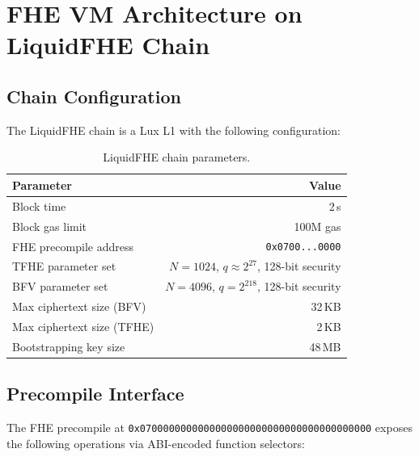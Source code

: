 \section{FHE VM Architecture on LiquidFHE Chain}

\label{sec:fhe-vm}

\subsection{Chain Configuration}

The LiquidFHE chain is a Lux L1 with the following configuration:

\begin{table}[ht]
\centering
\caption{LiquidFHE chain parameters.}
\label{tab:chain-config}
\begin{tabular}{lr}
\toprule
\textbf{Parameter} & \textbf{Value} \\
\midrule
Block time & 2\,s \\
Block gas limit & 100M gas \\
FHE precompile address & \texttt{0x0700...0000} \\
TFHE parameter set & $N = 1024$, $q \approx 2^{27}$, 128-bit security \\
BFV parameter set & $N = 4096$, $q = 2^{218}$, 128-bit security \\
Max ciphertext size (BFV) & 32\,KB \\
Max ciphertext size (TFHE) & 2\,KB \\
Bootstrapping key size & 48\,MB \\
\bottomrule
\end{tabular}
\end{table}

\subsection{Precompile Interface}

The FHE precompile at \texttt{0x0700000000000000000000000000000000000000} exposes the
following operations via ABI-encoded function selectors:

